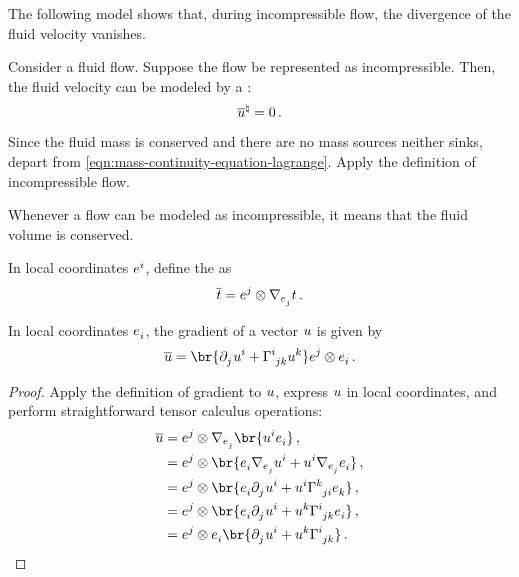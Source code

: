 The following model shows that, during incompressible flow, the divergence of the fluid velocity vanishes.
%
\begin{model}
  Consider a fluid flow. Suppose the flow be represented as incompressible. Then, the fluid velocity can be modeled by a :
  \begin{equation}\label{eqn:incompressible-flow-equation}
    {\overline{u}}^{\natural} = 0\,.
  \end{equation}
\end{model}
%
\begin{argument}
  Since the fluid mass is conserved and there are no mass sources neither sinks, depart from \cref{eqn:mass-continuity-equation-lagrange}. Apply the definition of incompressible flow.
\end{argument}
%
Whenever a flow can be modeled as incompressible, it means that the fluid volume is conserved.

\begin{definition}
  In local coordinates $\tbcov i$, define the  as
  \begin{equation}\label{eqn:covariant derivative}
    \grad t = \tbcov j\tprod\ocder{\tbvec j} t\,.
  \end{equation}
\end{definition}

\begin{theorem}
  In local coordinates $\tbvec i$, the gradient of a vector $u$ is given by
  \begin{equation}\label{eqn:gradient-vector-local-coordinates}
    \grad\vel =
    \br{
      \cpd j\tvec\vel i + \tchris ijk\tvec\vel k
    }\tbcov j\tprod\tbvec i\,.
  \end{equation}
\end{theorem}
%
\begin{proof}
  Apply the definition of gradient to $u$, express $u$ in local coordinates, and perform straightforward tensor calculus operations:
  \begin{align*}
    \grad\vel &= \tbcov j\tprod\ocder{\tbvec j}\br{\tvec\vel i\tbvec i}\,,\\
    &= \tbcov j\tprod\br{
      \tbvec i\ocder{\tbvec j}\tvec\vel i
      + \tvec\vel i\ocder{\tbvec j}\tbvec i
    }\,,\\
    &= \tbcov j\tprod\br{
      \tbvec i\cpd j\tvec\vel i
      + \tvec\vel i\tchris kji\tbvec k
    }\,,\\
    &= \tbcov j\tprod\br{
      \tbvec i\cpd j\tvec\vel i
      + \tvec\vel k\tchris ijk\tbvec i
    }\,,\\
    &= \tbcov j\tprod\tbvec i\br{
      \cpd j\tvec\vel i
      + \tvec\vel k\tchris ijk
    }\,.
  \end{align*}
\end{proof}

